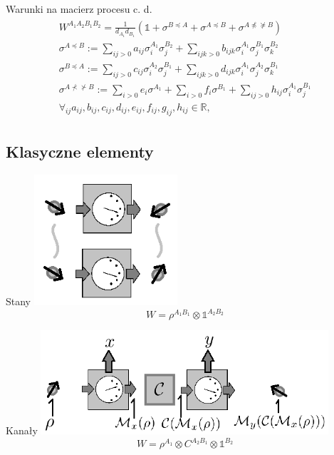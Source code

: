 \documentclass{beamer}
\newcommand{\WAll}{W^{A_1A_2B_1B_2}}
\newcommand{\I}{\mathbb{1}}
\begin{document}
\begin{frame}{Warunki na macierz procesu c. d.}
\centering
\begin{gather}
\begin{gathered}
\WAll = \frac{1}{d_{A_1}d_{B_1}}(\mathbb{1} +\sigma^{B \preceq A} + \sigma^{A \preceq B} + \sigma^{A \npreceq \nsucceq B}) \\
\sigma^{A \preceq B} := \sum_{ij>0} a_{ij} \sigma^{A_1}_i \sigma^{B_2}_j + \sum_{ijk>0} b_{ijk} \sigma^{A_1}_i \sigma^{B_1}_j \sigma^{B_2}_k \\
\sigma^{B \preceq A} := \sum_{ij>0} c_{ij} \sigma^{A_2}_i \sigma^{B_1}_j + \sum_{ijk>0} d_{ijk} \sigma^{A_1}_i \sigma^{A_2}_j \sigma^{B_1}_k \\
 \sigma^{A \nprec \nsucc B} := \sum_{i>0} e_i  \sigma^{A_1} + \sum_{i>0} f_i  \sigma^{B_1} + \sum_{ij>0} h_{ij} \sigma^{A_1}_i \sigma^{B_1}_j \\
 \forall_{ij} a_{ij}, b_{ij}, c_{ij}, d_{ij}, e_{ij}, f_{ij}, g_{ij}, h_{ij} \in \mathbb{R},
\end{gathered}
\end{gather}
\end{frame}

\subsection{Klasyczne elementy}
\begin{frame}{Stany}
\centering
\includegraphics[width=0.4\textwidth]{obrazki/states_new}\\
\begin{equation}
W = \rho^{A_1B_1} \otimes \I^{A_2B_2}
\end{equation}
\end{frame}

\begin{frame}{Kanały}
\centering
\includegraphics[width=0.8\textwidth]{obrazki/channel_new}\\
\begin{equation}
W = \rho^{A_1} \otimes C^{A_2B_1} \otimes \I^{B_2}
\end{equation}
\end{frame}
\end{document}
